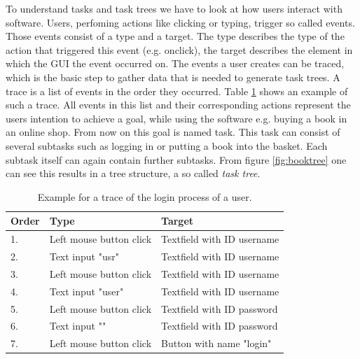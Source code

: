 To understand tasks and task trees we have to look at how users interact with software.
Users, perfoming actions like clicking or typing, trigger so called events.
Those events consist of a type and a target.
The type describes the type of the action that triggered this event (e.g. onclick), the target describes the element in which the GUI the event occurred on.
The events a user creates can be traced, which is the basic step to gather data that is needed to generate task trees.
A trace is a list of events in the order they occurred. Table \ref{tab:trace} shows an example of such a trace.
All events in this list and their corresponding actions represent the users intention to achieve a goal, while using the software e.g. buying a book
in an online shop. From now on this goal is named task. This task can consist of several subtasks such as logging in or putting a book into the basket.
Each subtask itself can again contain further subtasks. From figure \ref{fig:booktree} one can see this results in a tree structure, a so called \textit{task tree}.

\begin{table}
\begin{center}
 \begin{tabular}{l|l|l}
	   Order & Type & Target \\
	 \hline
	 \hline
	   1. & Left mouse button click &  Textfield with ID username \\
	   2. & Text input "usr" &  Textfield with ID username \\
	   3. & Left mouse button click &  Textfield with ID username \\
	   4. & Text input "user" &  Textfield with ID username \\
	   5. &Left mouse button click &  Textfield with ID password \\
	   6. & Text input "" &  Textfield with ID password \\
	   7. &Left mouse button click &  Button with name "login" \\
	  \end{tabular}
  \end{center}
  \caption{Example for a trace of the login process of a user.\cite{harms2013}}
  \label{tab:trace}
  \end{table}

